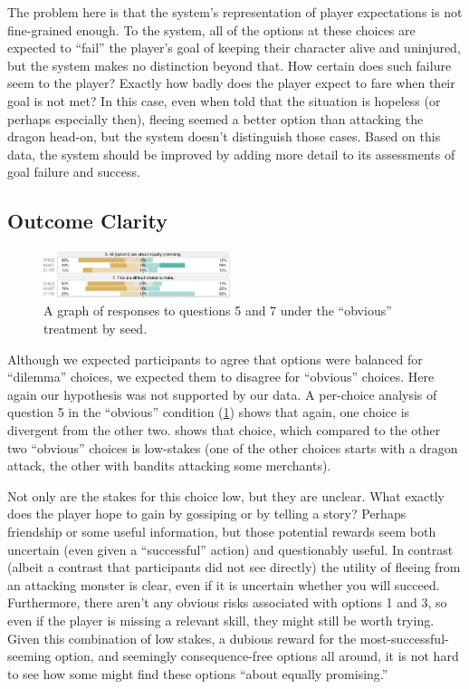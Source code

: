 The problem here is that the system's representation of player expectations is not fine-grained enough.
%
To the system, all of the options at these choices are expected to ``fail'' the player's goal of keeping their character alive and uninjured, but the system makes no distinction beyond that.
%
How certain does such failure seem to the player?
%
Exactly how badly does the player expect to fare when their goal is not met?
%
In this case, even when told that the situation is hopeless (or perhaps especially then), fleeing seemed a better option than attacking the dragon head-on, but the system doesn't distinguish those cases.
%
Based on this data, the system should be improved by adding more detail to its assessments of goal failure and success.


\subsection{Outcome Clarity}


\begin{figure}[h]
  \hspace*{-0.2em}\includegraphics[width=0.485\textwidth]{fig/obvious-q5-q7.pdf}
  \caption{A graph of responses to questions 5 and 7 under the ``obvious'' treatment by seed.}
  \label{fig:obviousq57}
\end{figure}


Although we expected participants to agree that options were balanced for ``dilemma'' choices, we expected them to disagree for ``obvious'' choices.
%
Here again our hypothesis was not supported by our data.
%
A per-choice analysis of question 5 in the ``obvious'' condition (\cref{fig:obviousq57}) shows that again, one choice is divergent from the other two.
%
 shows that choice, which compared to the other two ``obvious'' choices is low-stakes (one of the other choices starts with a dragon attack, the other with bandits attacking some merchants).


Not only are the stakes for this choice low, but they are unclear.
%
What exactly does the player hope to gain by gossiping or by telling a story?
%
Perhaps friendship or some useful information, but those potential rewards seem both uncertain (even given a ``successful'' action) and questionably useful.
%
In contrast (albeit a contrast that participants did not see directly) the utility of fleeing from an attacking monster is clear, even if it is uncertain whether you will succeed.
%
Furthermore, there aren't any obvious risks associated with options 1 and 3, so even if the player is missing a relevant skill, they might still be worth trying.
%
Given this combination of low stakes, a dubious reward for the most-successful-seeming option, and seemingly consequence-free options all around, it is not hard to see how some might find these options ``about equally promising.''


